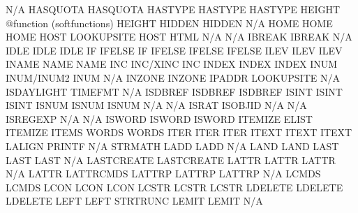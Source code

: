 \documentclass[letterpaper,10pt,english]{sphinxmanual}
\begin{document}
\begin{sphinxVerbatim}[commandchars=\\\{\}]
N/A                     HASQUOTA                     HASQUOTA
HASTYPE                 HASTYPE                      HASTYPE
HEIGHT                  @function (softfunctions)    HEIGHT
HIDDEN                  HIDDEN                       N/A
HOME                    HOME                         HOME
HOST                    LOOKUP\PYGZus{}SITE                  HOST
HTML                    N/A                          N/A
IBREAK                  IBREAK                       N/A
IDLE                    IDLE                         IDLE
IF                      IFELSE                       IF
IFELSE                  IFELSE                       IFELSE
ILEV                    ILEV                         ILEV
INAME                   NAME                         NAME
INC                     INC/XINC                     INC
INDEX                   INDEX                        INDEX
INUM                    INUM/INUM2                   INUM
N/A                     INZONE                       INZONE
IPADDR                  LOOKUP\PYGZus{}SITE                  N/A
ISDAYLIGHT              TIMEFMT                      N/A
ISDBREF                 ISDBREF                      ISDBREF
ISINT                   ISINT                        ISINT
ISNUM                   ISNUM                        ISNUM
N/A                     N/A                          ISRAT
ISOBJID                 N/A                          N/A
ISREGEXP                N/A                          N/A
ISWORD                  ISWORD                       ISWORD
ITEMIZE                 ELIST                        ITEMIZE
ITEMS                   WORDS                        WORDS
ITER                    ITER                         ITER
ITEXT                   ITEXT                        ITEXT
LALIGN                  PRINTF                       N/A
STRMATH                 LADD                         LADD
N/A                     LAND                         LAND
LAST                    LAST                         LAST
N/A                     LASTCREATE                   LASTCREATE
LATTR                   LATTR                        LATTR
N/A                     LATTR                        LATTRCMDS
LATTRP                  LATTRP                       LATTRP
N/A                     LCMDS                        LCMDS
LCON                    LCON                         LCON
LCSTR                   LCSTR                        LCSTR
LDELETE                 LDELETE                      LDELETE
LEFT                    LEFT                         STRTRUNC
LEMIT                   LEMIT                        N/A

\end{sphinxVerbatim}
\end{document}
